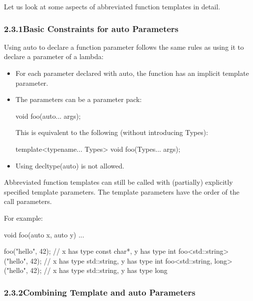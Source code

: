 
Let us look at some aspects of abbreviated function templates in detail.

\subsubsection*{ 2.3.1\hspace{0.2cm}Basic Constraints for auto Parameters}

Using auto to declare a function parameter follows the same rules as using it to declare a parameter of a lambda:

\begin{itemize}
\item
For each parameter declared with auto, the function has an implicit template parameter.

\item
The parameters can be a parameter pack:
\begin{cpp}
void foo(auto... args);
\end{cpp}

This is equivalent to the following (without introducing Types):
\begin{cpp}
template<typename... Types>
void foo(Types... args);
\end{cpp}

\item
Using decltype(auto) is not allowed.
\end{itemize}

Abbreviated function templates can still be called with (partially) explicitly specified template parameters. The template parameters have the order of the call parameters.

For example:

\begin{cpp}
void foo(auto x, auto y)
{
	...
}

foo("hello", 42); // x has type const char*, y has type int
foo<std::string>("hello", 42); // x has type std::string, y has type int
foo<std::string, long>("hello", 42); // x has type std::string, y has type long
\end{cpp}

\subsubsection*{ 2.3.2\hspace{0.2cm}Combining Template and auto Parameters}

